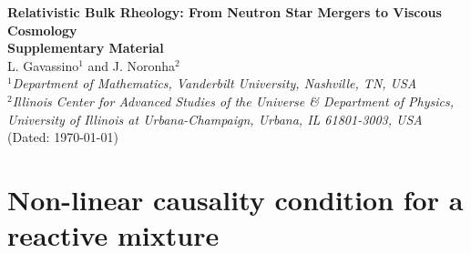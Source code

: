 \documentclass[aps,prl,noshowpacs,noshowkeys,floatfix,superscriptaddress,singlecolum,nofootinbib]{revtex4-2}
\theoremstyle{definition}
\theoremstyle{theorem}
\begin{document}



{}



\newpage


\onecolumngrid
\newpage
\begin{center}
  \textbf{\large Relativistic Bulk Rheology: From Neutron Star Mergers to Viscous Cosmology\\ 
Supplementary Material}\\[.2cm]
  L. Gavassino$^{1}$ and J. Noronha$^2$\\[.1cm]
  {\itshape ${}^1$Department of Mathematics, Vanderbilt University, Nashville, TN, USA\\
  ${}^2$Illinois Center for Advanced Studies of the Universe \& Department of Physics,\\University of Illinois at Urbana-Champaign, Urbana, IL 61801-3003, USA\\}
(Dated: \today)\\[1cm]
\end{center}

\setcounter{equation}{0}
\setcounter{figure}{0}
\setcounter{table}{0}
\setcounter{page}{1}
\renewcommand{\theequation}{S\arabic{equation}}
\renewcommand{\thefigure}{S\arabic{figure}}






\maketitle


\section{Non-linear causality condition for a reactive mixture}
\end{document}
